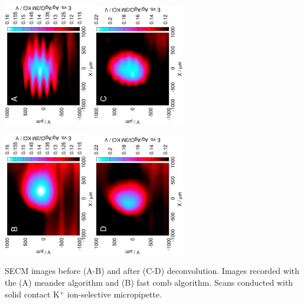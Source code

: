 \documentclass{beamer}
\begin{document}
\begin{frame}
\centering
\includegraphics[trim = 10mm 30mm 0mm 10mm, clip, width=0.3\textwidth, angle=-90]{14103106.eps}\includegraphics[trim = 10mm 30mm 0mm 10mm, clip, width=0.3\textwidth, angle=-90]{14103106_deconvoluted.eps}%

\includegraphics[trim = 10mm 30mm 0mm 10mm, clip, width=0.3\textwidth, angle=-90]{14103107.eps}\includegraphics[trim = 10mm 30mm 0mm 10mm, clip, width=0.3\textwidth, angle=-90]{14103107_deconvoluted.eps}

SECM images before (A-B) and after (C-D) deconvolution.
Images recorded with the (A) meander algorithm and (B) fast comb algorithm.
Scans conducted with solid contact K$^+$ ion-selective micropipette.
\end{frame}
\end{document}
